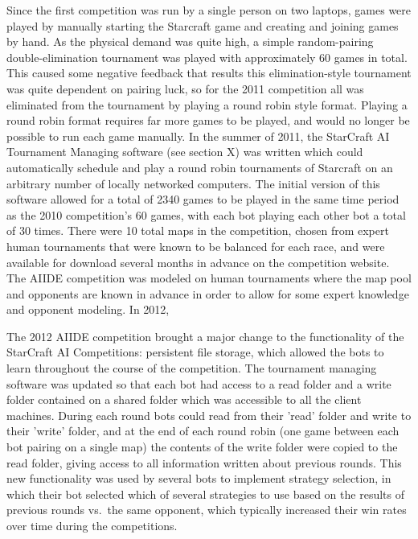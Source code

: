 Since the first competition was run by a single person on two laptops, games were played by manually starting the Starcraft game and creating and joining games by hand. As the physical demand was quite high, a simple random-pairing double-elimination tournament was played with approximately 60 games in total. This caused some negative feedback that results this elimination-style tournament was quite dependent on pairing luck, so for the 2011 competition all was eliminated from the tournament by playing a round robin style format. Playing a round robin format requires far more games to be played, and would no longer be possible to run each game manually. In the summer of 2011, the StarCraft AI Tournament Managing software (see section X) was written which could automatically schedule and play a round robin tournaments of Starcraft on an arbitrary number of locally networked computers. The initial version of this software allowed for a total of 2340 games to be played in the same time period as the 2010 competition's 60 games, with each bot playing each other bot a total of 30 times. There were 10 total maps in the competition, chosen from expert human tournaments that were known to be balanced for each race, and were available for download several months in advance on the competition website. The AIIDE competition was modeled on human tournaments where the map pool and opponents are known in advance in order to allow for some expert knowledge and opponent modeling. In 2012, 


The 2012 AIIDE competition brought a major change to the functionality of the StarCraft AI Competitions: persistent file storage, which allowed the bots to learn throughout the course of the competition. The tournament managing software was updated so that each bot had access to a read folder and a write folder contained on a shared folder which was accessible to all the client machines. During each round bots could read from their 'read' folder and write to their 'write' folder, and at the end of each round robin (one game between each bot pairing on a single map) the contents of the write folder were copied to the read folder, giving access to all information written about previous rounds. This new functionality was used by several bots to implement strategy selection, in which their bot selected which of several strategies to use based on the results of previous rounds vs.\ the same opponent, which typically increased their win rates over time during the competitions.

